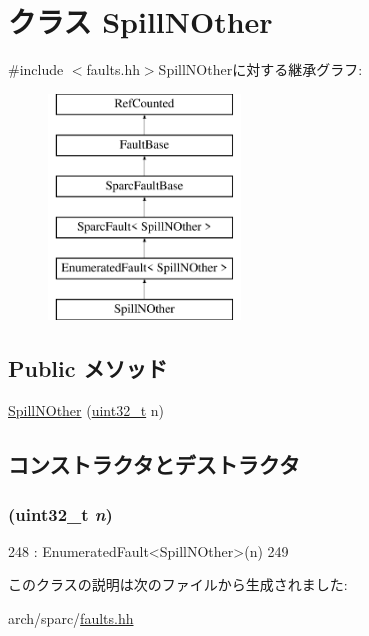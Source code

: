 \hypertarget{classSparcISA_1_1SpillNOther}{
\section{クラス SpillNOther}
\label{classSparcISA_1_1SpillNOther}
}


{\ttfamily \#include $<$faults.hh$>$}SpillNOtherに対する継承グラフ:\begin{figure}[H]
\begin{center}
\leavevmode
\includegraphics[height=6cm]{classSparcISA_1_1SpillNOther}
\end{center}
\end{figure}
\subsection*{Public メソッド}
\begin{DoxyCompactItemize}
\item 
\hyperlink{classSparcISA_1_1SpillNOther_a20196b39f32fa2cfa5283783ab2fd47a}{SpillNOther} (\hyperlink{Type_8hh_a435d1572bf3f880d55459d9805097f62}{uint32\_\-t} n)
\end{DoxyCompactItemize}


\subsection{コンストラクタとデストラクタ}
\hypertarget{classSparcISA_1_1SpillNOther_a20196b39f32fa2cfa5283783ab2fd47a}{
\subsubsection[{SpillNOther}]{ ({\bf uint32\_\-t} {\em n})}}
\label{classSparcISA_1_1SpillNOther_a20196b39f32fa2cfa5283783ab2fd47a}



\begin{DoxyCode}
248                             : EnumeratedFault<SpillNOther>(n)
249     {}
\end{DoxyCode}


このクラスの説明は次のファイルから生成されました:\begin{DoxyCompactItemize}
\item 
arch/sparc/\hyperlink{arch_2sparc_2faults_8hh}{faults.hh}\end{DoxyCompactItemize}
